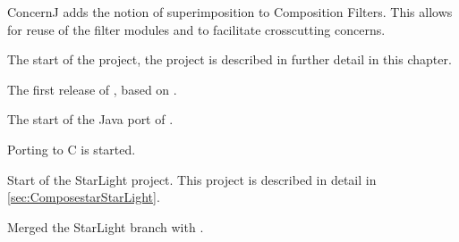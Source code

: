 \begin{description}[noitemsep,style=nextline,leftmargin=15mm]
            ConcernJ adds the notion of superimposition to Composition Filters.
            This allows for reuse of the filter modules and to facilitate crosscutting concerns.
\item[2003] The start of the \Compose* project, the project is described in further detail in this chapter.
\item[2004] The first release of \Compose*, based on \dotNET.
\item[2005] The start of the Java port of \Compose*.
\item[2006] Porting \Compose* to C is started.
\item[2006] Start of the StarLight project. This project is described in detail in \autoref{sec:ComposestarStarLight}.
\item[2007] Merged the StarLight branch with \Compose*.
\end{description}